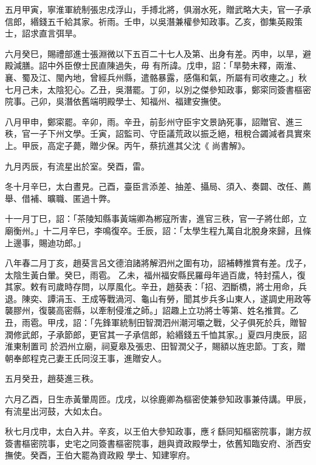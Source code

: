 \begin{pinyinscope}
 五月甲寅，寧淮軍統制張忠戍浮山，手搏北將，俱溺水死，贈武略大夫，官一子承信郎，緡錢五千給其家。祈雨。壬申，以吳潛兼權參知政事。乙亥，御集英殿策士，詔求直言弭旱。



 六月癸巳，賜禮部進士張淵微以下五百二十七人及第、出身有差。丙申，以旱，避殿減膳。詔中外臣僚士民直陳過失，毋
 有所諱。戊申，詔：「旱勢未釋，兩淮、襄、蜀及江、閩內地，曾經兵州縣，遣骼暴露，感傷和氣，所屬有司收瘞之。」秋七月己未，太陰犯心。乙丑，吳潛罷。丁卯，以別之傑參知政事，鄭寀同簽書樞密院事。己卯，吳潛依舊端明殿學士、知福州、福建安撫使。



 八月甲申，鄭寀罷。辛卯，雨。辛丑，前彭州守臣宇文景訥死事，詔贈官、進三秩，官一子下州文學。壬寅，詔監司、守臣議荒政以振乏絕，租稅合蠲減者具實來上。甲辰，高定子薨，贈少保。丙午，蔡抗進其父沈《
 尚書解》。



 九月丙辰，有流星出於室。癸酉，雷。



 冬十月辛巳，太白晝見。己酉，臺臣言添差、抽差、攝局、須入、奏闢、改任、薦舉、借補、曠職、匿過十弊。



 十一月丁巳，詔：「茶陵知縣事黃端卿為郴寇所害，進官三秩，官一子將仕郎，立廟衡州。」十二月辛巳，李鳴復卒。壬辰，詔：「太學生程九萬自北脫身來歸，且條上邊事，賜迪功郎。」



 八年春二月丁亥，趙葵言呂文德洎諸將解泗州之圍有功，詔補轉推賞有差。戊子，太陰生黃白暈。癸巳，雨雹。
 乙未，福州福安縣民羅母年過百歲，特封孺人，復其家。敕有司歲時存問，以厚風化。辛丑，趙葵表：「招、泗斷橋，將士用命，兵退。陳奕、譚涓玉、王成等戰渦河、龜山有勞，聞其步兵多山東人，遂調史用政等襲膠州，復襲高密縣，以牽制侵淮之師。」詔趣上立功將士等第、姓名推賞。乙丑，雨雹。甲戌，詔：「先鋒軍統制田智潤泗州潮河壩之戰，父子俱死於兵，贈智潤修武郎，子承節郎，更官其一子承信郎，給緡錢五千恤其家。」夏四月庚辰，詔淮東制置司
 於泗州立廟，祠夏皋及張忠、田智潤父子，賜額以旌忠節。丁亥，贈朝奉郎程克己妻王氏同沒王事，進贈安人。



 五月癸丑，趙葵進三秩。



 六月乙酉，日生赤黃暈周匝。戊戌，以徐鹿卿為樞密使兼參知政事兼侍講。甲辰，有流星出河鼓，大如太白。



 秋七月戊申，太白入井。辛亥，以王伯大參知政事，應彳繇同知樞密院事，謝方叔簽書樞密院事，史宅之同簽書樞密院事，趙與資政殿學士，依舊知臨安府、浙西安撫使。癸酉，王伯大罷為資政殿
 學士、知建寧府。




\end{pinyinscope}
